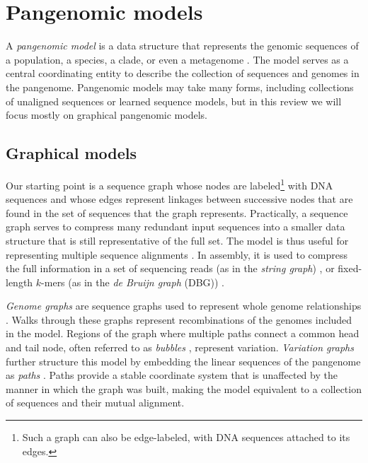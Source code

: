 \section{Pangenomic models}

A \emph{pangenomic model} is a data structure that represents the genomic sequences of a population, a species, a clade, or even a metagenome \cite{computational2016computational}.
The model serves as a central coordinating entity to describe the collection of sequences and genomes in the pangenome.
Pangenomic models may take many forms, including collections of unaligned sequences or learned sequence models, but in this review we will focus mostly on graphical pangenomic models.

\subsection{Graphical models}

Our starting point is a sequence graph \cite{hein1989new} whose nodes are labeled\footnote{Such a graph can also be edge-labeled, with DNA sequences attached to its edges.} with DNA sequences and whose edges represent linkages between successive nodes that are found in the set of sequences that the graph represents.
Practically, a sequence graph serves to compress many redundant input sequences into a smaller data structure that is still representative of the full set.
The model is thus useful for representing multiple sequence alignments \cite{hein1989new,Lee_2002}.
In assembly, it is used to compress the full information in a set of sequencing reads (as in the \emph{string graph}) \cite{Myers_2005}, or fixed-length $k$-mers (as in the \emph{de Bruijn graph} (DBG)) \cite{Pevzner_2001}.

\emph{Genome graphs} are sequence graphs used to represent whole genome relationships \cite{Paten_2017}.
Walks through these graphs represent recombinations of the genomes included in the model.
Regions of the graph where multiple paths connect a common head and tail node, often referred to as \emph{bubbles} \cite{paten2018superbubbles}, represent variation.
\emph{Variation graphs} further structure this model by embedding the linear sequences of the pangenome as \emph{paths} \cite{Garrison_2018}.
Paths provide a stable coordinate system that is unaffected by the manner in which the graph was built, making the model equivalent to a collection of sequences and their mutual alignment.


